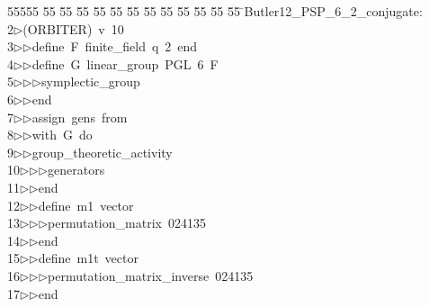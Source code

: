 %
%
\begin{tabbing}
55555 \= 55 \= 55 \= 55 \= 55 \= 55 \= 55 \= 55 \= 55 \= 55 \= 55 \= 55 \= 55 \= \>Butler12\_PSP\_6\_2\_conjugate:\\[0pt]
2\>$\triangleright$\>(ORBITER)\ v\ 10\ \\[0pt]
3\>$\triangleright$\>$\triangleright$\>define\ F\ finite\_field\ q\ 2\ end\ \\[0pt]
4\>$\triangleright$\>$\triangleright$\>define\ G\ linear\_group\ PGL\ 6\ F\ \\[0pt]
5\>$\triangleright$\>$\triangleright$\>$\triangleright$\>symplectic\_group\ \\[0pt]
6\>$\triangleright$\>$\triangleright$\>end\ \\[0pt]
7\>$\triangleright$\>$\triangleright$\>assign\ gens\ from\ \\[0pt]
8\>$\triangleright$\>$\triangleright$\>with\ G\ do\ \\[0pt]
9\>$\triangleright$\>$\triangleright$\>group\_theoretic\_activity\ \\[0pt]
10\>$\triangleright$\>$\triangleright$\>$\triangleright$\>generators\ \\[0pt]
11\>$\triangleright$\>$\triangleright$\>end\ \\[0pt]
12\>$\triangleright$\>$\triangleright$\>define\ m1\ vector\ \\[0pt]
13\>$\triangleright$\>$\triangleright$\>$\triangleright$\>permutation\_matrix\ 024135\ \\[0pt]
14\>$\triangleright$\>$\triangleright$\>end\ \\[0pt]
15\>$\triangleright$\>$\triangleright$\>define\ m1t\ vector\ \\[0pt]
16\>$\triangleright$\>$\triangleright$\>$\triangleright$\>permutation\_matrix\_inverse\ 024135\ \\[0pt]
17\>$\triangleright$\>$\triangleright$\>end\ \\[0pt]

\end{tabbing}
